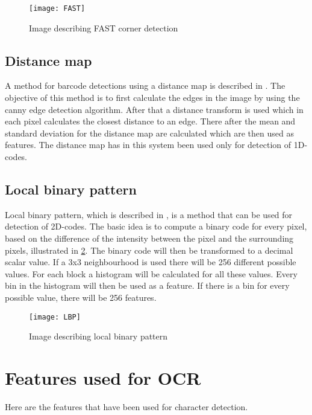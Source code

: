 \begin{figure}[H]
\centering
	\texttt{[image: FAST]}
	\caption{Image describing FAST corner detection}
	\label{FAST}
\end{figure}

\subsection{Distance map}
\label{sec:Distance map}
A method for barcode detections using a distance map is described in \citep{Bodnar}. The objective of this method is to first calculate the edges in the image by using the canny edge detection algorithm. After that a distance transform is used which in each pixel calculates the closest distance to an edge. There after the mean and standard deviation for the distance map are calculated which are then used as features. The distance map has in this system been used only for detection of 1D-codes.
 
\subsection{Local binary pattern}
\label{sec:Local binary pattern}
Local binary pattern, which is described in \citep{Pietikainen:2010}, is a method that can be used for detection of 2D-codes. The basic idea is to compute a binary code for every pixel, based on the difference of the intensity between the pixel and the surrounding pixels, illustrated in \ref{LBP}. The binary code will then be transformed to a decimal scalar value. If a 3x3 neighbourhood is used there will be 256 different possible values. For each block a histogram will be calculated for all these values. Every bin in the histogram will then be used as a feature. If there is a bin for every possible value, there will be 256 features.

\begin{figure}[H]
\centering
	\texttt{[image: LBP]}
	\caption{Image describing local binary pattern}
	\label{LBP}
\end{figure}

\section{Features used for OCR}
\label{sec:Features used for OCR}
Here are the features that have been used for character detection.

